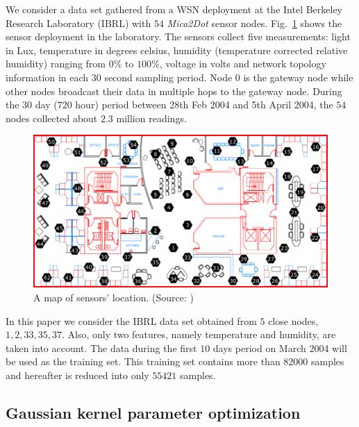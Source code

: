 \documentclass[conference]{IEEEtran}
\begin{document}
We consider a data set gathered from a WSN deployment at the Intel Berkeley Research Laboratory (IBRL) \cite{Buonadonna2005} with $54$ \emph{Mica2Dot} sensor nodes. Fig.~\ref{fig:sensor_map} shows the sensor deployment in the laboratory. The sensors collect five measurements: light in Lux, temperature in degrees celsius, humidity (temperature corrected relative humidity) ranging from $0\%$ to $100\%$, voltage in volts and network topology information in each $30$ second sampling period. Node $0$ is the gateway node while other nodes broadcast their data in multiple hops to the gateway node. During the $30$ day ($720$ hour) period between 28th Feb 2004 and 5th April 2004, the $54$ nodes collected about $2.3$ million readings.

\begin{figure}[H]
\centering
\includegraphics[scale=.25]{Figs/ibrl_wsn.png}
\caption{A map of sensors' location. (Source: \cite{Buonadonna2005})}
\label{fig:sensor_map}
\end{figure}

In this paper we consider the IBRL data set obtained from $5$ close nodes, $1, 2, 33, 35, 37$. Also, only two features, namely temperature and humidity, are taken into account. The data during the first $10$ days period on March 2004 will be used as the training set. This training set contains more than $82000$ samples and hereafter is reduced into only $55421$ samples. 

\subsection{Gaussian kernel parameter optimization}
\end{document}
